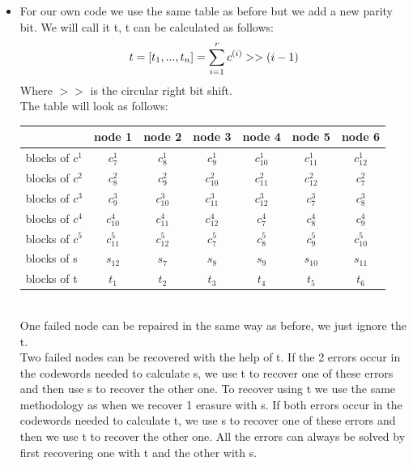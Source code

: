 \documentclass[12pt,a4paper,oneside]{article}
\begin{document}
\begin{itemize}
    \item For our own code we use the same table as before but we add a new parity bit. We will call it t, t can be calculated as follows:
    \begin{equation*}
        \centering
        t = [t_1,...,t_n] = \sum^{r}_{i = 1}c^{(i)} >> (i - 1)
    \end{equation*}
    Where $>>$ is the circular right bit shift.\\
    The table will look as follows:\\
    \begin{table}[h]
\centering
\begin{tabular}{l|c|c|c|c|c|c}
                  & node 1       & node 2       & node 3       & node 4       & node 5       & node 6\\\hline
blocks of $c^{1}$ & $c^{1}_{7}$  & $c^{1}_{8}$  & $c^{1}_{9}$  & $c^{1}_{10}$ & $c^{1}_{11}$ & $c^{1}_{12}$\\
blocks of $c^{2}$ & $c^{2}_{8}$  & $c^{2}_{9}$  & $c^{2}_{10}$ & $c^{2}_{11}$ & $c^{2}_{12}$ & $c^{2}_{7}$ \\
blocks of $c^{3}$ & $c^{3}_{9}$  & $c^{3}_{10}$ & $c^{3}_{11}$ & $c^{3}_{12}$ & $c^{3}_{7}$  & $c^{3}_{8}$ \\
blocks of $c^{4}$ & $c^{4}_{10}$ & $c^{4}_{11}$ & $c^{4}_{12}$ & $c^{4}_{7}$  & $c^{4}_{8}$  & $c^{4}_{9}$ \\
blocks of $c^{5}$ & $c^{5}_{11}$ & $c^{5}_{12}$ & $c^{5}_{7}$  & $c^{5}_{8}$  & $c^{5}_{9}$  & $c^{5}_{10}$\\
blocks of s       & $s_{12}$     & $s_{7}$      & $s_{8}$      & $s_{9}$      & $s_{10}$     & $s_{11}$    \\
blocks of t       & $t_{1}$      & $t_{2}$      & $t_{3}$      & $t_{4}$      & $t_{5}$      & $t_{6}$
\end{tabular}
\end{table}\\
One failed node can be repaired in the same way as before, we just ignore the t.\\
Two failed nodes can be recovered with the help of t. If the 2 errors occur in the codewords needed to calculate s, we use t to recover one of these errors and then use s to recover the other one. To recover using t we use the same methodology as when we recover 1 erasure with s. If both errors occur in the codewords needed to calculate t, we use s to recover one of these errors and then we use t to recover the other one. All the errors can always be solved by first recovering one with t and the other with s.\\

\end{itemize}
\end{document}
